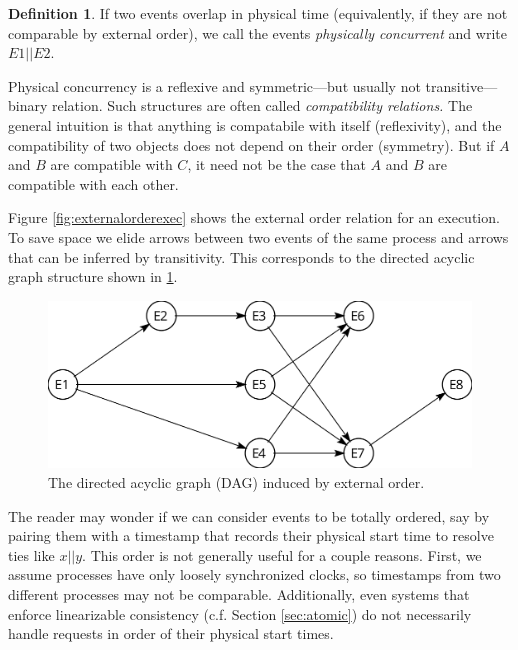 \documentclass[]             %
{NASA}                       %
\theoremstyle{definition}
\newtheorem{definition}{Definition}[section]
\begin{document}
\begin{definition}
  If two events overlap in physical time (equivalently, if they are
  not comparable by external order), we call the events
  \emph{physically concurrent} and write $E1 || E2$.
\end{definition}

Physical concurrency is a reflexive and symmetric---but usually not
transitive--- binary relation. Such structures are often called
\emph{compatibility relations.} The general intuition is that anything
is compatabile with itself (reflexivity), and the compatibility of two
objects does not depend on their order (symmetry). But if \(A\) and
\(B\) are compatible with \(C\), it need not be the case that \(A\)
and \(B\) are compatible with each other.

Figure \ref{fig:externalorderexec} shows the external order relation
for an execution. To save space we elide arrows between two events of
the same process and arrows that can be inferred by transitivity. This
corresponds to the directed acyclic graph structure shown in
\ref{fig:externalorderdag}.

\begin{figure}[h]
    \center
    \includegraphics[scale=0.25]{images/partialorder.png}
    \caption{The directed acyclic graph (DAG) induced by external order.}
    \label{fig:externalorderdag}
\end{figure}

The reader may wonder if we can consider events to be totally ordered,
say by pairing them with a timestamp that records their physical start
time to resolve ties like \(x || y\). This order is not generally useful
for a couple reasons. First, we assume processes have only loosely
synchronized clocks, so timestamps from two different processes may not
be comparable. Additionally, even systems that enforce linearizable
consistency (c.f. Section \ref{sec:atomic}) do not necessarily handle
requests in order of their physical start times.
\end{document}
